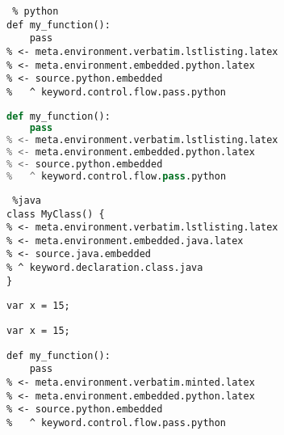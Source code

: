 \documentclass[12pt]{article}
\begin{document}

\begin{lstlisting} % python
def my_function():
    pass
% <- meta.environment.verbatim.lstlisting.latex
% <- meta.environment.embedded.python.latex
% <- source.python.embedded
%   ^ keyword.control.flow.pass.python
\end{lstlisting}

\begin{lstlisting}[frame=single,
                   language=python] %python
def my_function():
    pass
% <- meta.environment.verbatim.lstlisting.latex
% <- meta.environment.embedded.python.latex
% <- source.python.embedded
%   ^ keyword.control.flow.pass.python
\end{lstlisting}

\begin{lstlisting} %java
class MyClass() {
% <- meta.environment.verbatim.lstlisting.latex
% <- meta.environment.embedded.java.latex
% <- source.java.embedded
% ^ keyword.declaration.class.java
}
\end{lstlisting}

\lstinline{var x = 15;}

\lstinline|var x = 15;|



\begin{verbatim}
def my_function():
    pass
% <- meta.environment.verbatim.minted.latex
% <- meta.environment.embedded.python.latex
% <- source.python.embedded
%   ^ keyword.control.flow.pass.python
\end{verbatim}


\end{document}
